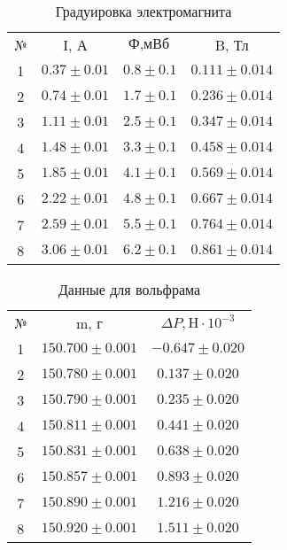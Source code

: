 \documentclass[a4paper]{article}
\begin{document}
\begin{table}[h]
    \centering
        \begin{tabular}{|c|c|c|c|}
        \cline{1-4}
        № & I, А & $\text{Ф}, \text{мВб}$ & B, $\text{Тл}$\\ \cline{1-4}
        1&  $0.37\pm 0.01$& $0.8\pm 0.1$ &$0.111 \pm 0.014$\\ \cline{1-4}
        2&  $0.74\pm 0.01$& $1.7\pm 0.1$ &$0.236 \pm 0.014$\\ \cline{1-4}
        3&  $1.11\pm 0.01$& $2.5\pm 0.1$ &$0.347 \pm 0.014$\\ \cline{1-4}
        4&  $1.48\pm 0.01$& $3.3\pm 0.1$ &$0.458 \pm 0.014$\\ \cline{1-4}
        5&  $1.85\pm 0.01$& $4.1\pm 0.1$ &$0.569 \pm 0.014$\\ \cline{1-4}
        6&  $2.22\pm 0.01$& $4.8\pm 0.1$ &$0.667 \pm 0.014$\\ \cline{1-4}
        7&  $2.59\pm 0.01$& $5.5\pm 0.1$ &$0.764 \pm 0.014$\\ \cline{1-4}
        8&  $3.06\pm 0.01$& $6.2\pm 0.1$ &$0.861 \pm 0.014$\\ \cline{1-4}
        \end{tabular}
        \caption{Градуировка электромагнита}
        \label{tab:my_label}
    \end{table}

    \begin{table}[h]
    \centering
        \begin{tabular}{|c|c|c|}
        \cline{1-3}
        № & m, $\text{г}$ & $\Delta P, \text{H} \cdot 10^{-3}$\\ \cline{1-3}
        1&  $150.700\pm 0.001$& $-0.647 \pm 0.020$\\ \cline{1-3}
        2&  $150.780\pm 0.001$& $0.137 \pm 0.020$\\ \cline{1-3}
        3&  $150.790\pm 0.001$& $0.235 \pm 0.020$\\ \cline{1-3}
        4&  $150.811\pm 0.001$& $0.441 \pm 0.020$\\ \cline{1-3}
        5&  $150.831\pm 0.001$& $0.638 \pm 0.020$\\ \cline{1-3}
        6&  $150.857\pm 0.001$& $0.893 \pm 0.020$\\ \cline{1-3}
        7&  $150.890\pm 0.001$& $1.216 \pm 0.020$\\ \cline{1-3}
        8&  $150.920\pm 0.001$& $1.511 \pm 0.020$\\ \cline{1-3}
        \end{tabular}
        \caption{Данные для вольфрама}
        \label{tab:my_label}
    \end{table}
\end{document}
